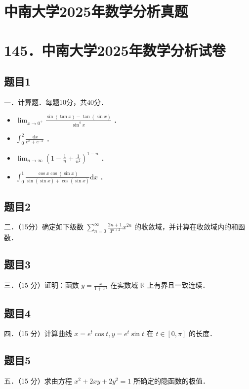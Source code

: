 \documentclass{article}
\begin{document}
\section*{中南大学2025年数学分析真题}
\section*{145．中南大学2025年数学分析试卷}

\subsection{题目1}
一．计算题．每题10分，共40分．

\begin{itemize}
  \item[（1）] \(\lim _{x \rightarrow 0^{+}} \frac{\sin (\tan x)-\tan (\sin x)}{\sin ^{4} x}\) ．
  \item[（2）] \(\int_{0}^{2} \frac{\mathrm{~d} x}{e^{x}+e^{-x}}\) ．
  \item[（3）] \(\lim _{n \rightarrow \infty}\left(1-\frac{1}{n}+\frac{1}{n^{2}}\right)^{1-n}\) ．
  \item[（4）] \(\int_{0}^{1} \frac{\cos x \cos (\sin x)}{\sin (\sin x)+\cos (\sin x)} \mathrm{d} x\) ．
\end{itemize}

\subsection{题目2}
二．（15分）确定如下级数 \(\sum_{n=0}^{\infty} \frac{2 n+1}{3^{n+2}} x^{2 n}\) 的收敛域，并计算在收敛域内的和函数．

\subsection{题目3}
三．（15 分）证明：函数 \(y=\frac{x}{1+x^{4}}\) 在实数域 \(\mathbb{R}\) 上有界且一致连续．

\subsection{题目4}
四．（15 分）计算曲线 \(x=e^{t} \cos t, y=e^{t} \sin t\) 在 \(t \in[0, \pi]\) 的长度．

\subsection{题目5}
五．（15 分）求由方程 \(x^{2}+2 x y+2 y^{2}=1\) 所确定的隐函数的极值．
\end{document}
